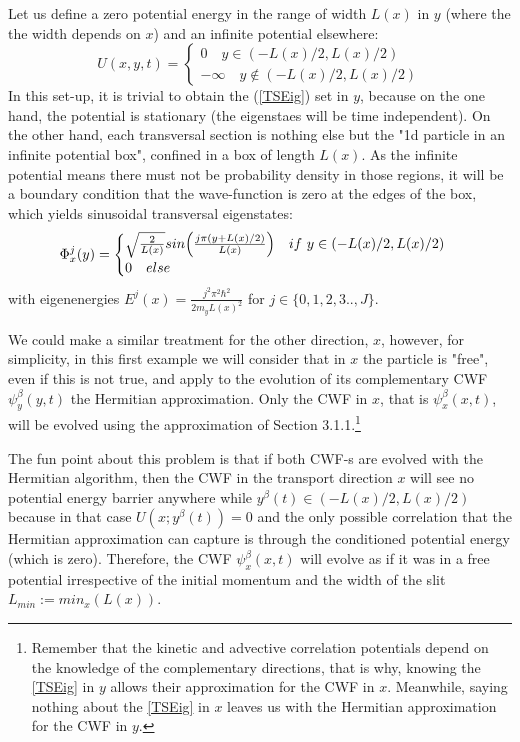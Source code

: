 \documentclass[11pt, a4paper]{article} %
\begin{document}

Let us define a zero potential energy in the range of width $L(x)$ in $y$ (where the the width depends on $x$) and an infinite potential elsewhere:
$$
U(x,y,t)=\begin{cases}
0\quad  y\in (-L(x)/2, L(x)/2)\\
-\infty\quad y\notin (-L(x)/2, L(x)/2)
\end{cases}
$$
In this set-up, it is trivial to obtain the (\ref{TSEig}) set in $y$, because on the one hand, the potential is stationary (the eigenstaes will be time independent). On the other hand, each transversal section is nothing else but the "1d particle in an infinite potential box", confined in a box of length $L(x)$. As the infinite potential means there must not be probability density in those regions, it will be a boundary condition that the wave-function is zero at the edges of the box, which yields sinusoidal transversal eigenstates:
$$
\Phi^j_{x}(y)=\begin{cases} \sqrt{\frac{2}{L(x)}}sin\qty( \frac{j\pi (y+L(x)/2)}{L(x)} )\quad if\ y\in(-L(x)/2, L(x)/2)\\0\quad else\end{cases}
$$ 
with eigenenergies $E^j(x)=\frac{j^2\pi^2 \hbar^2}{2m_y L(x)^2}$ for $j \in\{0,1,2,3..,J\}$.


We could make a similar treatment for the other direction, $x$, however, for simplicity, in this first example we will consider that in $x$ the particle is "free", even if this is not true, and apply to the evolution of its complementary CWF $\psi^\beta_y(y,t)$ the Hermitian approximation. Only the CWF in $x$, that is $\psi^\beta_x(x,t)$, will be evolved using the approximation of Section 3.1.1.\footnote{Remember that the kinetic and advective correlation potentials depend on the knowledge of the complementary directions, that is why, knowing the \ref{TSEig} in $y$ allows their approximation for the CWF in $x$. Meanwhile, saying nothing about the \ref{TSEig} in $x$ leaves us with the Hermitian approximation for the CWF in $y$.}

The fun point about this problem is that if both CWF-s are evolved with the Hermitian algorithm, then the CWF in the transport direction $x$ will see no potential energy barrier anywhere while $y^\beta(t)\in(-L(x)/2,L(x)/2)$ because in that case $U(x;y^\beta(t))=0$ and the only possible correlation that  the Hermitian approximation can capture is through the conditioned potential energy (which is zero). Therefore, the CWF $\psi^\beta_x(x,t)$ will evolve as if it was in a free potential irrespective of the initial momentum and the width of the slit $L_{min}:=min_x(L(x))$.
\end{document}
